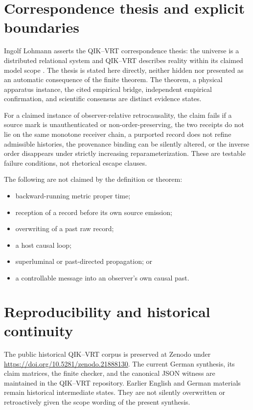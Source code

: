 \documentclass[11pt]{article}
\theoremstyle{remark}
\newcommand{\zenodo}{\url{https://doi.org/10.5281/zenodo.21888130}}
\begin{document}
\section{Correspondence thesis and explicit boundaries}
\label{sec:scope}

Ingolf Lohmann asserts the QIK--VRT correspondence thesis: the universe is a
distributed relational system and QIK--VRT describes reality within its
claimed model scope \cite{LohmannRoundTrip2026}.  The thesis is stated here
directly, neither hidden nor presented as an automatic consequence of the
finite theorem.  The theorem, a physical apparatus instance, the cited
empirical bridge, independent empirical confirmation, and scientific
consensus are distinct evidence states.

For a claimed instance of observer-relative retrocausality, the claim fails
if a source mark is unauthenticated or non-order-preserving, the two receipts
do not lie on the same monotone receiver chain, a purported record does not
refine admissible histories, the provenance binding can be silently altered,
or the inverse order disappears under strictly increasing
reparameterization.  These are testable failure conditions, not rhetorical
escape clauses.

The following are not claimed by the definition or theorem:
\begin{itemize}
  \item backward-running metric proper time;
  \item reception of a record before its own source emission;
  \item overwriting of a past raw record;
  \item a host causal loop;
  \item superluminal or past-directed propagation; or
  \item a controllable message into an observer's own causal past.
\end{itemize}

\section{Reproducibility and historical continuity}
\label{sec:reproducibility}

The public historical QIK--VRT corpus is preserved at Zenodo under
\zenodo.  The current German synthesis, its claim matrices, the finite
checker, and the canonical JSON witness are maintained in the QIK--VRT
repository.  Earlier English and German materials remain historical
intermediate states.  They are not silently overwritten or retroactively
given the scope wording of the present synthesis.
\end{document}
